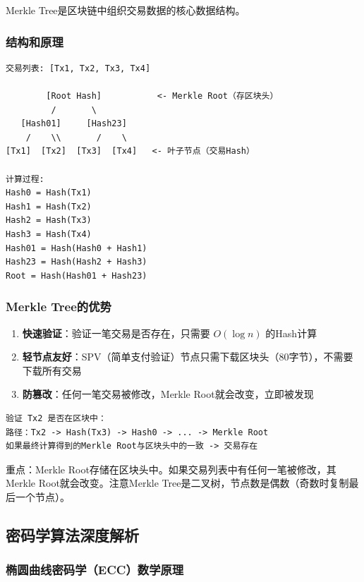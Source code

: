 ﻿\documentclass[12pt,a4paper]{article}
\begin{document}
Merkle Tree是区块链中组织交易数据的核心数据结构。

\subsubsection{结构和原理}

\begin{lstlisting}
交易列表: [Tx1, Tx2, Tx3, Tx4]

        [Root Hash]           <- Merkle Root（存区块头）
         /       \
   [Hash01]     [Hash23]
    /    \\       /    \
[Tx1]  [Tx2]  [Tx3]  [Tx4]   <- 叶子节点（交易Hash）

计算过程:
Hash0 = Hash(Tx1)
Hash1 = Hash(Tx2)
Hash2 = Hash(Tx3)
Hash3 = Hash(Tx4)
Hash01 = Hash(Hash0 + Hash1)
Hash23 = Hash(Hash2 + Hash3)
Root = Hash(Hash01 + Hash23)
\end{lstlisting}

\subsubsection{Merkle Tree的优势}

\begin{enumerate}[leftmargin=1.5em]
\item \textbf{快速验证}：验证一笔交易是否存在，只需要 $O(\log n)$ 的Hash计算
\item \textbf{轻节点友好}：SPV（简单支付验证）节点只需下载区块头（80字节），不需要下载所有交易
\item \textbf{防篡改}：任何一笔交易被修改，Merkle Root就会改变，立即被发现
\end{enumerate}

\begin{lstlisting}
验证 Tx2 是否在区块中：
路径：Tx2 -> Hash(Tx3) -> Hash0 -> ... -> Merkle Root
如果最终计算得到的Merkle Root与区块头中的一致 -> 交易存在
\end{lstlisting}

\begin{keypointbox}
重点：Merkle Root存储在区块头中。如果交易列表中有任何一笔被修改，其Merkle Root就会改变。注意Merkle Tree是二叉树，节点数是偶数（奇数时复制最后一个节点）。
\end{keypointbox}

\subsection{密码学算法深度解析}

\subsubsection{椭圆曲线密码学（ECC）数学原理}
\end{document}
